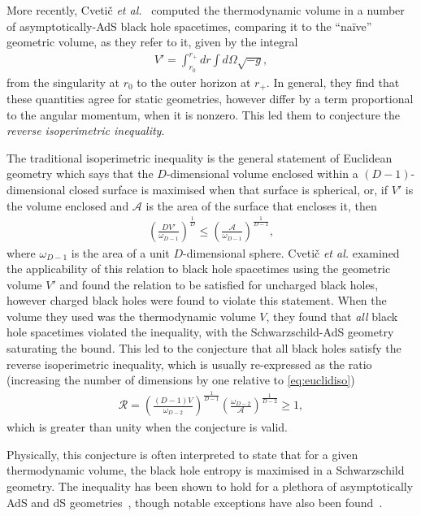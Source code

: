 \documentclass[
twoside,
openright,
frontopenright
]{dmathesis}
\begin{document}
More recently, Cveti\v c \emph{et al.}~\cite{Cvetic:2010jb} computed the
thermodynamic volume in a number of asymptotically-AdS black hole spacetimes,
comparing it to the ``na\" ive'' geometric volume, as they refer to it, given by
the integral
\begin{align}
  V' = \int_{r_0}^{r_+}dr\int d\Omega \sqrt{-g},
\end{align}
from the singularity at $r_0$ to the outer horizon at $r_+$. In general, they
find that these quantities agree for static geometries, however differ by a term
proportional to the angular momentum, when it is nonzero. This led them to
conjecture the \emph{reverse isoperimetric inequality}.

The traditional isoperimetric inequality is the general statement of Euclidean
geometry which says that the $D$-dimensional volume enclosed within a
$(D-1)$-dimensional closed surface is maximised when that surface is spherical,
or, if $V'$ is the volume enclosed and $\mathcal{A}$ is the area of
the surface that encloses it, then
\begin{align}\label{eq:euclidiso}
\left(\frac{D V'}{\omega_{D-1}}\right)^{\frac{1}{D}} \leqslant
  \left(\frac{\mathcal{A}}{\omega_{D-1}}\right)^{\frac{1}{D-1}},
\end{align}
where $\omega_{D-1}$ is the area of a unit $D$-dimensional sphere. Cveti\v c
\emph{et al.} examined the applicability of this relation to black hole
spacetimes using the geometric volume $V'$ and found the relation to be
satisfied for uncharged black holes, however charged black holes were found to
violate this statement. When the volume they used was the thermodynamic volume
$V$, they found that \emph{all} black hole spacetimes violated the inequality,
with the Schwarzschild-AdS geometry saturating the bound. This led to the
conjecture that all black holes satisfy the reverse isoperimetric inequality,
which is usually re-expressed as the ratio (increasing the number of
  dimensions by one relative to \cref{eq:euclidiso})
\begin{align}
  \mathcal{R} =
  \left(\frac{(D-1)V}{\omega_{D-2}}\right)^{\frac{1}{D-1}}
  \left(\frac{\omega_{D-2}}{\mathcal{A}}\right)^{\frac{1}{D-2}} 
  \geqslant 1,
\end{align}
which is greater than unity when the conjecture is valid.

Physically, this conjecture is often interpreted to state that for a given
thermodynamic volume, the black hole entropy is maximised in a Schwarzschild
geometry. The inequality has been shown to hold for a plethora of asymptotically
AdS and dS geometries~\cite{Cvetic:2010jb,Dolan:2013ft}, though notable
exceptions have also been
found~\cite{Hennigar:2014cfa,Hennigar:2015cja,Brenna:2015pqa}.
\end{document}
